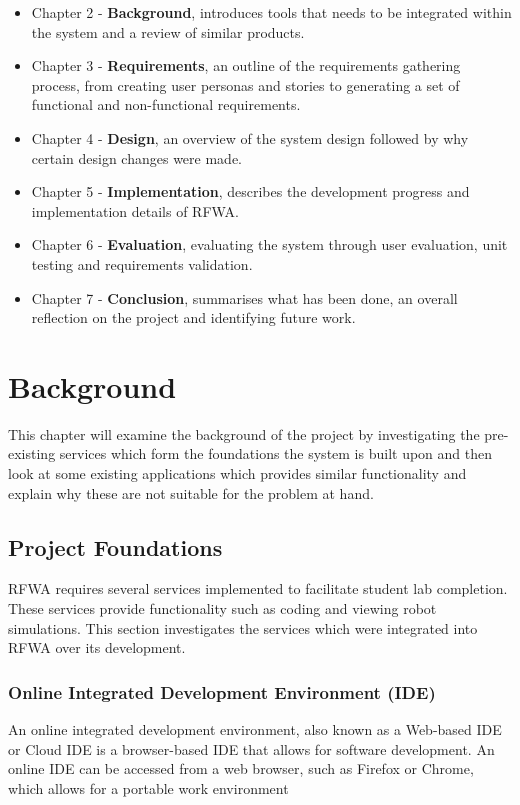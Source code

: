 \documentclass{l4proj}
\begin{document}
\begin{itemize}
    \item 
    Chapter 2 - \textbf{Background}, introduces tools that needs to be integrated within the system and a review of similar products.
    \item 
    Chapter 3 - \textbf{Requirements}, an outline of the requirements gathering process, from creating user personas and stories to generating a set of functional and non-functional requirements.
    \item 
    Chapter 4 - \textbf{Design}, an overview of the system design followed by why certain design changes were made.
    \item 
    Chapter 5 - \textbf{Implementation}, describes the development progress and implementation details of RFWA.
    \item 
    Chapter 6 - \textbf{Evaluation}, evaluating the system through user evaluation, unit testing and requirements validation.
    \item 
    Chapter 7 - \textbf{Conclusion}, summarises what has been done, an overall reflection on the project and identifying future work.
    
\end{itemize}


\chapter{Background}
This chapter will examine the background of the project by investigating the pre-existing services which form the foundations the system is built upon and then look at some existing applications which provides similar functionality and explain why these are not suitable for the problem at hand. 

\section{Project Foundations}

RFWA requires several services implemented to facilitate student lab completion. These services provide functionality such as coding and viewing robot simulations. This section investigates the services which were integrated into RFWA over its development.

\subsection{Online Integrated Development Environment (IDE)}
An online integrated development environment, also known as a Web-based IDE or Cloud IDE is a browser-based IDE that allows for software development. An online IDE can be accessed from a web browser, such as Firefox or Chrome, which allows for a portable work environment
\end{document}
